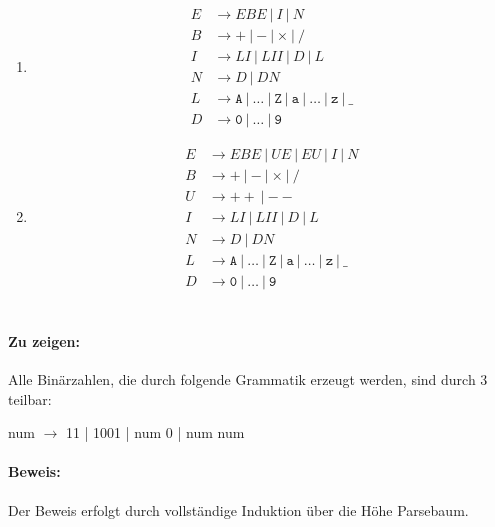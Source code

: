 \documentclass[a4paper,10pt]{scrartcl}
\begin{document}
\section{}
\begin{enumerate}
 \item	
    \begin{align*}
     E &\to EBE\ |\ I\ |\ N\\
     B &\to \mathtt{+}\ |\ \mathtt{-}\ |\ \mathtt{\times}\ |\ \mathtt{/}\\
     I &\to LI\ |\ LII\ |\ D\ |\ L \\
     N &\to D\ |\ DN \\
     L &\to \mathtt{A}\ |\ \dots\ |\ \mathtt{Z}\ |\ \mathtt{a}\ |\ \dots\ |\
\mathtt{z}\ |\ \mathtt{\_}\\
     D &\to \mathtt{0}\ |\ \dots\ |\ \mathtt{9} 
    \end{align*}
 \item	
    \begin{align*}
     E &\to EBE\ |\ UE\ |\ EU\ |\ I\ |\ N\\
     B &\to \mathtt{+}\ |\ \mathtt{-}\ |\ \mathtt{\times}\ |\ \mathtt{/}\\
     U &\to \mathtt{++}\ |\ \mathtt{--}\\
     I &\to LI\ |\ LII\ |\ D\ |\ L \\
     N &\to D\ |\ DN \\
     L &\to \mathtt{A}\ |\ \dots\ |\ \mathtt{Z}\ |\ \mathtt{a}\ |\ \dots\ |\
\mathtt{z}\ |\ \mathtt{\_}\\
     D &\to \mathtt{0}\ |\ \dots\ |\ \mathtt{9} 
    \end{align*}
\end{enumerate}

\section{}
\paragraph{Zu zeigen:}
Alle Binärzahlen, die durch folgende Grammatik erzeugt werden, sind durch 3 teilbar:

num $\to$ 11 | 1001 | num 0 | num num

\paragraph{Beweis:}
Der Beweis erfolgt durch vollständige Induktion über die Höhe Parsebaum.
\end{document}
